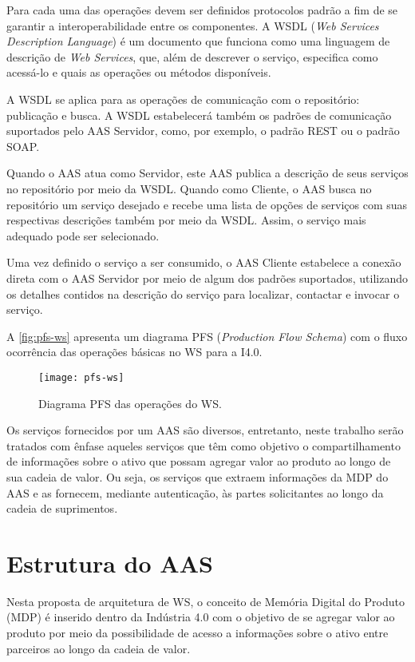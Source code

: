 	Para cada uma das operações devem ser definidos protocolos padrão a fim de se garantir a interoperabilidade entre os componentes. A WSDL (\textit{Web Services Description Language}) é um documento que funciona como uma linguagem de descrição de \textit{Web Services}, que, além de descrever o serviço, especifica como acessá-lo e quais as operações ou métodos disponíveis. 
	
	A WSDL se aplica para as operações de comunicação com o repositório: publicação e busca. A WSDL estabelecerá também os padrões de comunicação suportados pelo AAS Servidor, como, por exemplo, o padrão REST ou o padrão SOAP.
	
	Quando o AAS atua como Servidor, este AAS publica a descrição de seus serviços no repositório por meio da WSDL. Quando como Cliente, o AAS busca no repositório um serviço desejado e recebe uma lista de opções de serviços com suas respectivas descrições também por meio da WSDL. Assim, o serviço mais adequado pode ser selecionado.
	
	Uma vez definido o serviço a ser consumido, o AAS Cliente estabelece a conexão direta com o AAS Servidor por meio de algum dos padrões suportados, utilizando os detalhes contidos na descrição do serviço para localizar, contactar e invocar o serviço.
	
	A \autoref{fig:pfs-ws} apresenta um diagrama PFS (\textit{Production Flow Schema}) com o fluxo ocorrência das operações básicas no WS para a I4.0.
	
	\begin{figure}[htb]
		\centering
		\caption{Diagrama PFS das operações do WS.}
		\label{fig:pfs-ws}
		\texttt{[image: pfs-ws]}
	\end{figure}
	
	Os serviços fornecidos por um AAS são diversos, entretanto, neste trabalho serão tratados com ênfase aqueles serviços que têm como objetivo o compartilhamento de informações sobre o ativo que possam agregar valor ao produto ao longo de sua cadeia de valor. Ou seja, os serviços que extraem informações da MDP do AAS e as fornecem, mediante autenticação, às partes solicitantes ao longo da cadeia de suprimentos.

\section{Estrutura do AAS }

	Nesta proposta de arquitetura de WS, o conceito de Memória Digital do Produto (MDP) é inserido dentro da Indústria 4.0 com o objetivo de se agregar valor ao produto por meio da possibilidade de acesso a informações sobre o ativo entre parceiros ao longo da cadeia de valor.
	
